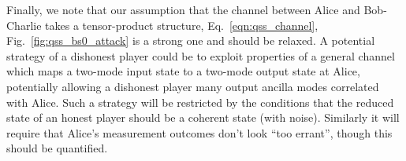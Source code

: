 Finally, we note that our assumption that the channel between Alice and Bob-Charlie takes a tensor-product structure, Eq.~\ref{eqn:qss_channel}, Fig.~\ref{fig:qss_bs0_attack} is a strong one and should be relaxed. A potential strategy of a dishonest player could be to exploit properties of a general channel which maps a two-mode input state to a two-mode output state at Alice, potentially allowing a dishonest player many output ancilla modes correlated with Alice. Such a strategy will be restricted by the conditions that the reduced state of an honest player should be a coherent state (with noise). Similarly it will require that Alice's measurement outcomes don't look ``too errant'', though this should be quantified.








